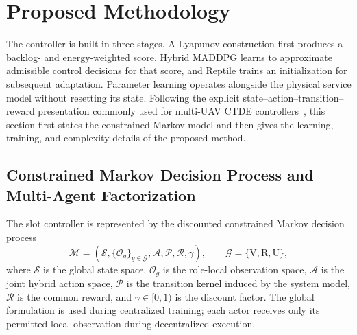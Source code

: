 \documentclass[journal]{IEEEtran}
\begin{document}
\section{Proposed Methodology}
\label{proposed_methodology}
The controller is built in three stages. A Lyapunov construction first
produces a backlog- and energy-weighted score. Hybrid MADDPG learns to
approximate admissible control decisions for that score, and Reptile trains an
initialization for subsequent adaptation. Parameter learning operates
alongside the physical service model without resetting its state.  Following
the explicit state--action--transition--reward presentation commonly used for
multi-UAV CTDE controllers~\cite{talukdar2026bamappo}, this section first
states the constrained Markov model and then gives the learning, training, and
complexity details of the proposed method.

\subsection{Constrained Markov Decision Process and Multi-Agent Factorization}
The slot controller is represented by the discounted constrained Markov
decision process
\begin{equation}
\mathcal M=\left(\mathcal S,\{\mathcal O_g\}_{g\in\mathcal G},
\mathcal A,\mathcal P,\mathcal R,\gamma\right),
\qquad \mathcal G=\{\mathrm V,\mathrm R,\mathrm U\},
\label{eq:mdp_tuple}
\end{equation}
where $\mathcal S$ is the global state space, $\mathcal O_g$ is the
role-local observation space, $\mathcal A$ is the joint hybrid action space,
$\mathcal P$ is the transition kernel induced by the system model,
$\mathcal R$ is the common reward, and $\gamma\in[0,1)$ is the discount
factor.  The global formulation is used during centralized training; each
actor receives only its permitted local observation during decentralized
execution.
\end{document}
